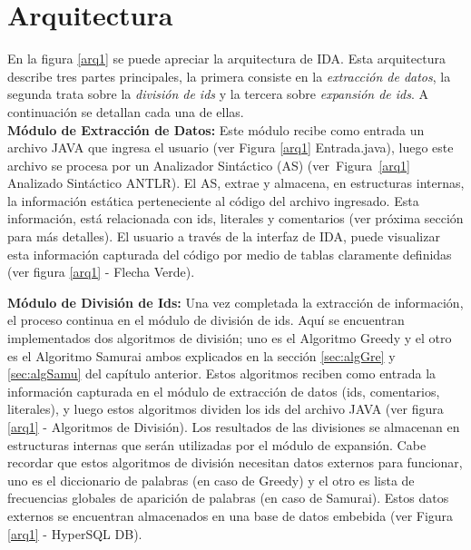 \section{Arquitectura}


En la figura \ref{arq1} se puede apreciar la arquitectura de IDA. Esta arquitectura describe tres partes principales, la primera consiste en la \textit{extracción de datos}, la segunda trata sobre la \textit{división de ids} y la tercera sobre \textit{expansión de ids}. A continuación se detallan cada una de ellas.\\

\textbf{Módulo de Extracción de Datos:} Este módulo recibe como entrada un archivo JAVA que ingresa el usuario (ver Figura \ref{arq1} Entrada.java), luego este archivo se procesa por un Analizador Sintáctico (AS) (\mbox{ver Figura \ref{arq1}} Analizado Sintáctico ANTLR). El AS, extrae y almacena, en estructuras internas, la información estática perteneciente al código del archivo ingresado. Esta información, está relacionada con ids, literales y comentarios (ver próxima sección para más detalles). El usuario a través de la interfaz de IDA, puede visualizar esta información capturada del código por medio de tablas claramente definidas (ver figura \ref{arq1} - Flecha Verde).

\textbf{Módulo de División de Ids:} Una vez completada la extracción de información, el proceso continua en el módulo de división de ids. Aquí se encuentran implementados dos algoritmos de división; uno es el Algoritmo Greedy y el otro es el Algoritmo Samurai ambos explicados en la sección \ref{sec:algGre} y \ref{sec:algSamu} del capítulo anterior. Estos algoritmos reciben como entrada la información capturada en el módulo de extracción de datos (ids, comentarios, literales), y luego estos algoritmos dividen los ids del archivo JAVA (ver figura \ref{arq1} - Algoritmos de División). Los resultados de las divisiones se almacenan en estructuras internas que serán utilizadas por el módulo de expansión. Cabe recordar que estos algoritmos de división necesitan datos externos para funcionar, uno es el diccionario de palabras (en caso de Greedy) y el otro es lista de frecuencias globales de aparición de palabras (en caso de Samurai). Estos datos externos se encuentran almacenados en una base de datos embebida (ver Figura \ref{arq1} - HyperSQL DB).


